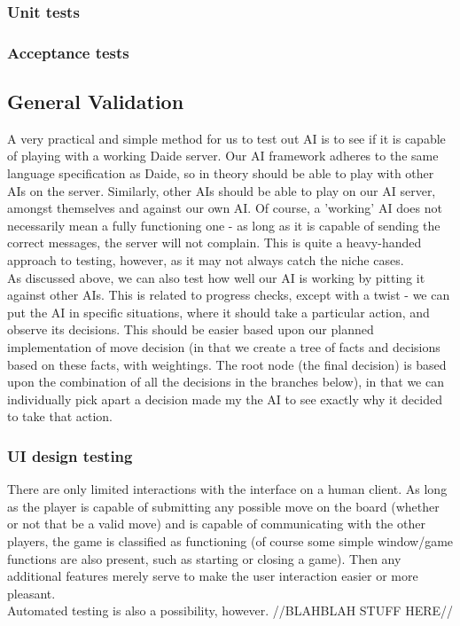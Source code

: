 \documentclass[11pt]{article}
\begin{document}
\subsubsection{Unit tests}

\subsubsection{Acceptance tests}

\subsection{General Validation}
A very practical and simple method for us to test out AI is to see if it is 
capable of playing with a working Daide server. Our AI framework adheres to the
same language specification as Daide, so in theory should be able to play with
other AIs on the server. Similarly, other AIs should be able to play on our AI
server, amongst themselves and against our own AI. Of course, a 'working' AI 
does not necessarily mean a fully functioning one - as long as it is capable of
sending the correct messages, the server will not complain. This is quite a 
heavy-handed approach to testing, however, as it may not always catch the niche
cases.
\\
As discussed above, we can also test how well our AI is working by pitting it
against other AIs. This is related to progress checks, except with a twist - we
can put the AI in specific situations, where it should take a particular action,
and observe its decisions. This should be easier based upon our planned 
implementation of move decision (in that we create a tree of facts and decisions
based on these facts, with weightings. The root node (the final decision) is 
based upon the combination of all the decisions in the branches below), in that
we can individually pick apart a decision made my the AI to see exactly why it
decided to take that action.

\subsubsection{UI design testing}
There are only limited interactions with the interface on a human client. As 
long as the player is capable of submitting any possible move on the board
(whether or not that be a valid move) and is capable of communicating with the
other players, the game is classified as functioning (of course some simple 
window/game functions are also present, such as starting or closing a game).
Then any additional features merely serve to make the user interaction easier 
or more pleasant.
\\
Automated testing is also a possibility, however. //BLAHBLAH STUFF HERE//
\end{document}
